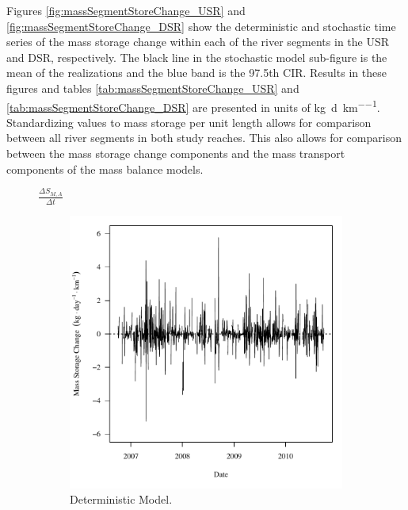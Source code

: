 \begin{linenumbers}
Figures \ref{fig:massSegmentStoreChange_USR} and \ref{fig:massSegmentStoreChange_DSR} show the deterministic and stochastic time series of the mass storage change within each of the river segments in the USR and DSR, respectively.  The black line in the stochastic model sub-figure is the mean of the realizations and the blue band is the 97.5th CIR.   Results in these figures and tables \ref{tab:massSegmentStoreChange_USR} and \ref{tab:massSegmentStoreChange_DSR} are presented in units of \si{\kilo\gram\per\day\per\kilo\meter}.  Standardizing values to mass storage per unit length allows for comparison between all river segments in both study reaches.  This also allows for comparison between the mass storage change components and the mass transport components of the mass balance models.

\subfiguretop
\begin{landscape}
	\begin{figure}
		$ \displaystyle \frac{\Delta S_{M,A}}{\Delta t} $
		\begin{subfigure}{0.7\textwidth}
			\centering
			\includegraphics[width=\tableCustomSize]{"Figures/Results_USR/Deterministic/f Segment A"}
			\caption{Deterministic Model.}
		\end{subfigure}%
		\begin{subfigure}{0.7\textwidth}
			\centering

\end{subfigure}
\end{figure}
\end{landscape}
\end{linenumbers}
